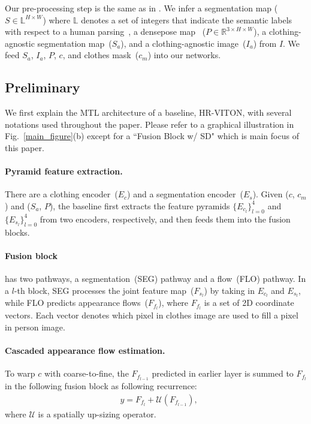 \documentclass[letterpaper]{article} %
\begin{document}
Our pre-processing step is the same as in \cite{lee2022hrviton,choi2021viton}.
We infer a segmentation map ($S \in \mathbb{L}^{H\times W}$) where $\mathbb{L}$ denotes a set of integers that indicate the semantic labels with respect to a human parsing~\cite{gong2018instance}, a densepose map~\cite{guler2018densepose} ($P \in \mathbb{R}^{3 \times H\times W}$), a clothing-agnostic segmentation map~($S_a$), and a clothing-agnostic image~($I_a$) from $I$.
We feed $S_a$, $I_a$, $P$, $c$, and clothes mask~($c_m$) into our networks.

\subsection{Preliminary}
We first explain the MTL architecture of a baseline, HR-VITON, with several notations used throughout the paper.
Please refer to a graphical illustration in Fig.~\ref{main_figure}(b) except for a ``Fusion Block w/ SD" which is main focus of this paper.

\paragraph{Pyramid feature extraction.}
There are a clothing encoder~($E_c$) and a segmentation encoder~($E_s$).
Given ($c$, $c_m$) and ($S_a$, $P$), the baseline first extracts the feature pyramids $\{E_{c_l}\}_{l=0}^{4}$ and $\{E_{s_l}\}_{l=0}^{4}$ from two encoders, respectively, and then feeds them into the fusion blocks.

\paragraph{Fusion block} has two pathways, a segmentation~(SEG) pathway and a flow~(FLO) pathway.
In a $l$-th block, SEG processes the joint feature map~($F_{s_l}$) by taking in $E_{c_l}$ and $E_{s_l}$, while FLO predicts appearance flows~($F_{f_l}$), where $F_{f_l}$ is a set of 2D coordinate vectors.
Each vector denotes which pixel in clothes image are used to fill a pixel in person image.

\paragraph{Cascaded appearance flow estimation.}
To warp $c$ with coarse-to-fine, the $F_{f_{l-1}}$ predicted in earlier layer is summed to $F_{f_{l}}$ in the following fusion block as following recurrence:
\begin{eqnarray}
    & y = F_{f_{l}} + \mathcal{U}(F_{f_{l-1}}),
    \label{eq_recursive}
\end{eqnarray}
where $\mathcal{U}$ is a spatially up-sizing operator. 
\end{document}
